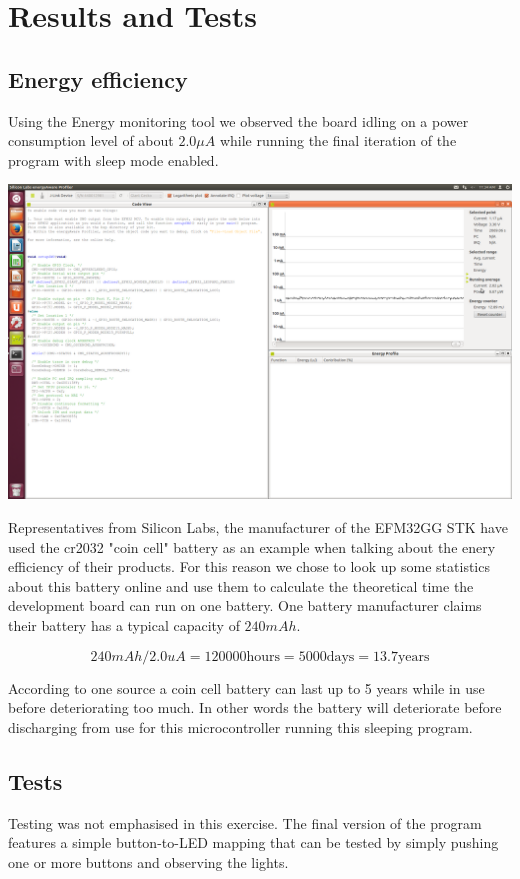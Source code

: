 \chapter{Results and Tests}
\label{chap:results}

\section{Energy efficiency}
Using the Energy monitoring tool we observed the board idling on a power consumption level of about $2.0 \mu A$ while running the final iteration of the program with sleep mode enabled.

\includegraphics[width=\linewidth]{img/eAProfiler.png}

Representatives from Silicon Labs, the manufacturer of the EFM32GG STK have used the cr2032 "coin cell" battery as an example when talking about the enery efficiency of their products. For this reason we chose to look up some statistics about this battery online and use them to calculate the theoretical time the development board can run on one battery. One battery manufacturer claims their battery has a typical capacity of $240 mAh$.\cite{cr2032spec}

\[
	240 mAh / 2.0 uA = 120 000 \text{hours} = 5000 \text{days} = 13.7 \text{years}
\]

According to one source \cite{cr2032} a coin cell battery can last up to 5 years while in use before deteriorating too much. In other words the battery will deteriorate before discharging from use for this microcontroller running this sleeping program.

\section{Tests}
Testing was not emphasised in this exercise. The final version of the program features a simple button-to-LED mapping that can be tested by simply pushing one or more buttons and observing the lights.

